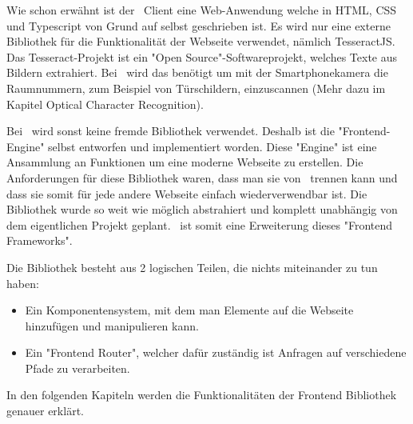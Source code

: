 
Wie schon erwähnt ist der \ZELIA\ Client eine Web-Anwendung welche in HTML, CSS und Typescript von Grund auf selbst geschrieben ist. Es wird nur eine externe Bibliothek für die Funktionalität der Webseite verwendet, nämlich TesseractJS. Das Tesseract-Projekt ist ein "Open Source"-Softwareprojekt, welches Texte aus Bildern extrahiert. Bei \ZELIA\ wird das benötigt um mit der Smartphonekamera die Raumnummern, zum Beispiel von Türschildern, einzuscannen (Mehr dazu im Kapitel Optical Character Recognition).

Bei \ZELIA\ wird sonst keine fremde Bibliothek verwendet. Deshalb ist die "Frontend-Engine" selbst entworfen und implementiert worden. Diese "Engine" ist eine Ansammlung an Funktionen um eine moderne Webseite zu erstellen. Die Anforderungen für diese Bibliothek waren, dass man sie von \ZELIA\ trennen kann und dass sie somit für jede andere Webseite einfach wiederverwendbar ist. Die Bibliothek wurde so weit wie möglich abstrahiert und komplett unabhängig von dem eigentlichen Projekt geplant. \ZELIA\ ist somit eine Erweiterung dieses "Frontend Frameworks".

Die Bibliothek besteht aus 2 logischen Teilen, die nichts miteinander zu tun haben:
\begin{itemize}
    \item Ein Komponentensystem, mit dem man Elemente auf die Webseite hinzufügen und manipulieren kann. 
    \item Ein "Frontend Router", welcher dafür zuständig ist Anfragen auf verschiedene Pfade zu verarbeiten.
\end{itemize}

In den folgenden Kapiteln werden die Funktionalitäten der Frontend Bibliothek genauer erklärt.